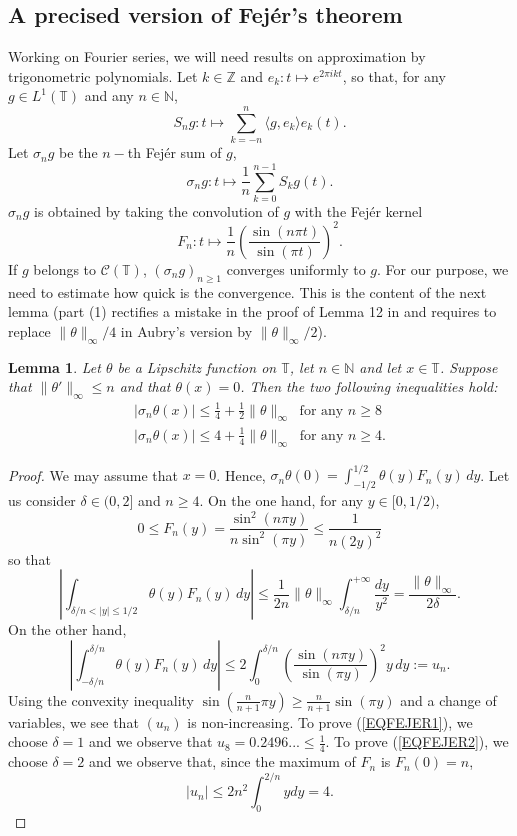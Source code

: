 \documentclass[11pt,a4paper]{amsart}
\theoremstyle{plain}
\newtheorem{lemma}[theorem]{Lemma}
\begin{document}
\subsection{A precised version of Fej\'er's theorem}

Working on Fourier series, we will need results on approximation by trigonometric polynomials.
Let $k\in\mathbb Z$ and $e_k:t\mapsto e^{2\pi i kt}$, so that, for any $g\in L^1({\mathbb T})$
and any $n\in\mathbb N$, 
$$S_ng:t\mapsto \sum_{k=-n}^n \langle g,e_k\rangle e_k(t).$$
Let $\sigma_ng$ be the $n-$th Fej\'er sum of $g$,
$$\sigma_n g:t\mapsto \frac 1n\sum_{k=0}^{n-1}S_kg(t).$$
$\sigma_n g$ is obtained by taking the convolution of $g$ with the Fej\'er kernel 
$$F_n:t\mapsto \frac 1n\left(\frac{\sin(n\pi t)}{\sin(\pi t)}\right)^2.$$
If $g$ belongs to $\mathcal C({\mathbb T})$, $(\sigma_n g)_{n\ge 1}$ converges uniformly to $g$. For our purpose, we need to estimate how quick is the convergence. This is the content
of the next lemma (part (1) rectifies a mistake in the proof of Lemma 12
in \cite{Aub06} and requires to replace $\|\theta\|_\infty/4$ in Aubry's
version  by $\|\theta\|_\infty/2$).

\begin{lemma}\label{LEMFEJER}Let $\theta$ be a Lipschitz
    function on ${\mathbb T}$, let $n\in\mathbb N$ and let $x\in\mathbb T$.  Suppose that $\|\theta'\|_\infty\le n$
    and that $\theta(x)=0$. Then the two following inequalities hold:
\begin{eqnarray}\label{EQFEJER1}
|\sigma_{n}\theta(x)|\le\frac14+\frac12\|\theta\|_\infty\ \textrm{ for any }n\geq 8\\
|\sigma_{n}\theta(x)|\le 4+\frac14\|\theta\|_\infty\ \textrm{ for any }n\geq 4.\label{EQFEJER2}
\end{eqnarray}
\end{lemma}
\begin{proof}
 We may assume that $x=0$. Hence,
$\sigma_{n}\theta(0)=\int_{-1/2}^{1/2}\theta(y)F_{n}(y)\,dy$. Let us consider $\delta\in(0,2]$ and $n\ge 4$.
On the one hand, for any $y\in[0,1/2)$,
$$0\leq F_{n}(y)=\frac{\sin^2(n\pi y)}{n\sin^2(\pi
  y)}\leq\frac1{n(2y)^2}$$ 
so that 
$$\left|\int_{\delta/n<|y|\le1/2}\theta(y)F_{n}(y)\,dy\right|\leq
\frac{1}{2n}\|\theta\|_\infty\int_{\delta/n}^{+\infty}\frac{dy}{y^2}=\frac{\|\theta\|_\infty}{2\delta}.$$
On the other hand, 
$$\left|\int_{-\delta/n}^{\delta/n}\theta(y)F_{n}(y)\,dy\right|\leq
2\int_0^{\delta/n}\left(\frac{\sin (n\pi y)}{\sin(\pi y)}\right)^2y\,dy := u_n.$$
Using the convexity inequality $\sin\left(\frac{n}{n+1}\pi y\right)\geq
\frac{n}{n+1}\sin(\pi y)$ and a change of variables, we see that $(u_n)$ is
non-increasing. To prove (\ref{EQFEJER1}), we choose $\delta=1$ and we observe that $u_8=0.2496...\leq \frac14$.
To prove (\ref{EQFEJER2}), we choose $\delta=2$ and we observe that, since the maximum of $F_n$ is $F_n(0)=n$,
$$|u_n|\leq 2n^2\int_0^{2/n} ydy=4.$$
\end{proof}
\end{document}
